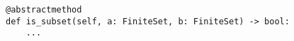 \begin{verbatim}
@abstractmethod
def is_subset(self, a: FiniteSet, b: FiniteSet) -> bool:
    ...
\end{verbatim}